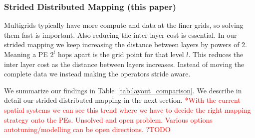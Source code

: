 \documentclass[sigconf]{acmart}
\begin{document}
\subsubsection{Strided Distributed Mapping (this paper)}
        Multigrids typically have more compute and data at the finer grids, so solving them fast is important. Also reducing the inter layer cost is essential. In our strided mapping we keep increasing the distance between layers by powers of 2. Meaning a PE $2^l$ hops apart is the grid point for that level $l$. This reduces the inter layer cost as the distance between layers increases. Instead of moving the complete data we instead making the operators stride aware. 

We summarize our findings in Table~\ref{tab:layout_comparison}. We describe in detail our strided distributed mapping in the next section.
            \textcolor{red}{*With the current spatial systems we can see this trend where we have to decide the right mapping strategy onto the PEs. Unsolved and open problem. Various options autotuning/modelling can be open directions. ?TODO}
\end{document}
